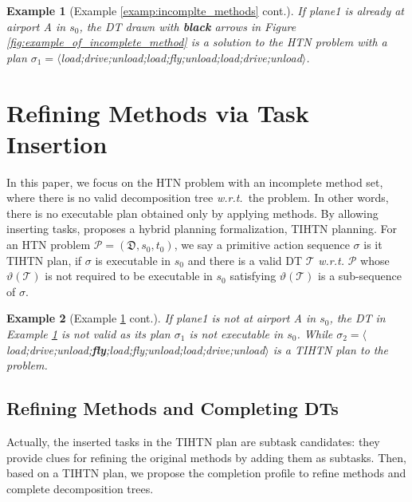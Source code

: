 \documentclass[letterpaper]{article} %
\newtheorem{examp}{Example}
\newcommand{\HtnDomain}{\mathfrak{D}}
\newcommand{\HtnProblem}{\mathcal{P}}
\newcommand{\plan}{\sigma}
\newcommand{\Dtree}{\mathcal{T}}
\newcommand{\yield}{\vartheta}
\begin{document}
\begin{examp}[Example \ref{examp:incomplte_methods} cont.]\label{examp:solution}
If \textsf{plane1} is already at airport A in $s_0$, the DT drawn with \textbf{black} arrows in Figure \ref{fig:example_of_incomplete_method} is %
a solution to the HTN problem with a plan
$\plan_1=\langle${\small\textsf{load};\textsf{drive};\textsf{unload};\textsf{load};\textsf{fly};\textsf{unload};\textsf{load};\textsf{drive};\textsf{unload}}$\rangle$.
\end{examp}





\section{Refining Methods via Task Insertion}
In this paper, we focus on the HTN problem with an incomplete method set, where there is no valid decomposition tree \emph{w.r.t.}\ the problem.
In other words, there is no executable plan obtained only by applying methods.
By allowing inserting tasks, \cite{geier2011decidability} proposes a hybrid planning formalization, TIHTN planning.
For an HTN problem $\HtnProblem = (\HtnDomain,s_0,t_0)$, we say a primitive action sequence $\plan$ is it TIHTN plan, if $\plan$ is executable in $s_0$ and
there is a valid DT $\Dtree$ \emph{w.r.t.} $\HtnProblem$ whose $\yield(\Dtree)$ is not required to be executable in $s_0$ satisfying $\yield(\Dtree)$ is a sub-sequence of $\plan$.
\begin{examp}[Example \ref{examp:solution} cont.]\label{examp:tihtn_solution}
If \textsf{plane1} is not at airport A in $s_0$, the DT in Example \ref{examp:solution} is not valid as its plan $\plan_1$ is not executable in $s_0$.
While $\plan_2=\langle${\small\textsf{load};\textsf{drive};\textsf{unload};\textbf{fly};\textsf{load};\textsf{fly};\textsf{unload};\textsf{load};\textsf{drive};\textsf{unload}}$\rangle$ is a TIHTN plan to the problem.
\end{examp}






\subsection{Refining Methods and Completing DTs}
Actually, the inserted tasks in the TIHTN plan are subtask candidates: they provide clues for refining the original methods by adding them as subtasks.
Then, based on a TIHTN plan, we propose the completion profile to refine methods and complete decomposition trees.
\end{document}
